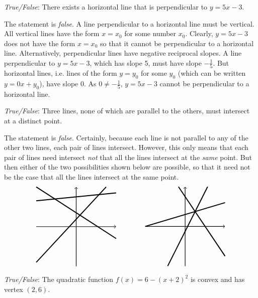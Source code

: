 \documentclass[11pt,letterpaper]{article}
\begin{document}
\quizsol \textit{True/False}: There exists a horizontal line that is perpendicular to $y= 5x - 3$. \pspace

\sol The statement is \textit{false}. A line perpendicular to a horizontal line must be vertical. All vertical lines have the form $x= x_0$ for some number $x_0$. Clearly, $y= 5x - 3$ does not have the form $x= x_0$ so that it cannot be perpendicular to a horizontal line. Alternatively, perpendicular lines have negative reciprocal slopes. A line perpendicular to $y= 5x - 3$, which has slope 5, must have slope $-\frac{1}{5}$. But horizontal lines, i.e. lines of the form $y= y_0$ for some $y_0$ (which can be written $y= 0x + y_0$), have slope 0. As $0 \neq -\frac{1}{5}$, $y= 5x - 3$ cannot be perpendicular to a horizontal line. \pvspace{1.3cm}



\quizsol \textit{True/False}: Three lines, none of which are parallel to the others, must intersect at a distinct point. \pspace

\sol The statement is \textit{false}. Certainly, because each line is not parallel to any of the other two lines, each pair of lines intersect. However, this only means that each pair of lines need intersect \textit{not} that all the lines intersect at the \textit{same} point. But then either of the two possibilities shown below are possible, so that it need not be the case that all the lines intersect at the same point. 
	\[
	\begin{tikzpicture}
	\draw[line width=0.03cm,->] (-2,0) -- (2,0);
	\draw[line width=0.03cm,->] (0,-2) -- (0,2);
	\draw[line width= 0.05cm] (-2,1.3) -- (2,1.7);
	\draw[line width= 0.05cm] (-2,2) -- (2,-0.6);
	\draw[line width= 0.05cm] (-2,-1.8) -- (1.5,2);
	\end{tikzpicture}
	\qquad \qquad
	\begin{tikzpicture}
	\draw[line width=0.03cm,->] (-2,0) -- (2,0);
	\draw[line width=0.03cm,->] (0,-2) -- (0,2);
	\draw[line width= 0.05cm] (1.125, 2) -- (-0.875,-2);
	\draw[line width= 0.05cm] (-2,0) -- (2,1.2);
	\draw[line width= 0.05cm] (2,-1.5) -- (-0.333,2);
	\end{tikzpicture}
	\]



\newpage



\quizsol \textit{True/False}: The quadratic function $f(x)= 6 - (x + 2)^2$ is convex and has vertex $(2, 6)$. \pspace
\end{document}
